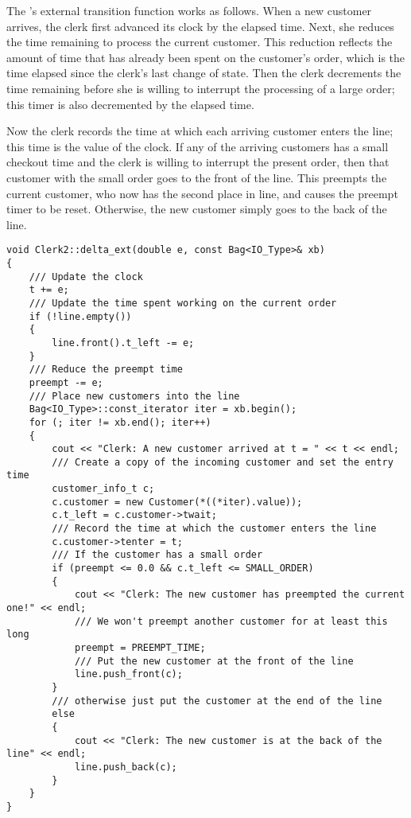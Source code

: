 The 's external transition function works as follows. When a new customer arrives, the clerk first advanced its clock by the elapsed time. Next, she reduces the time remaining to process the current customer. This reduction reflects the amount of time that has already been spent on the customer's order, which is the time elapsed since the clerk's last change of state. Then the clerk decrements the time remaining before she is willing to interrupt the processing of a large order; this timer is also decremented by the elapsed time.

Now the clerk records the time at which each arriving customer enters the line; this time is the value of the clock. If any of the arriving customers has a small checkout time and the clerk is willing to interrupt the present order, then that customer with the small order goes to the front of the line. This preempts the current customer, who now has the second place in line, and causes the preempt timer to be reset. Otherwise, the new customer simply goes to the back of the line.
\begin{verbatim}
void Clerk2::delta_ext(double e, const Bag<IO_Type>& xb)
{
    /// Update the clock
    t += e;
    /// Update the time spent working on the current order
    if (!line.empty())
    {
        line.front().t_left -= e;
    }
    /// Reduce the preempt time
    preempt -= e;
    /// Place new customers into the line
    Bag<IO_Type>::const_iterator iter = xb.begin();
    for (; iter != xb.end(); iter++)
    {
        cout << "Clerk: A new customer arrived at t = " << t << endl;
        /// Create a copy of the incoming customer and set the entry time
        customer_info_t c;
        c.customer = new Customer(*((*iter).value));
        c.t_left = c.customer->twait;
        /// Record the time at which the customer enters the line
        c.customer->tenter = t;
        /// If the customer has a small order
        if (preempt <= 0.0 && c.t_left <= SMALL_ORDER)
        {
            cout << "Clerk: The new customer has preempted the current one!" << endl;
            /// We won't preempt another customer for at least this long
            preempt = PREEMPT_TIME;
            /// Put the new customer at the front of the line
            line.push_front(c);
        }
        /// otherwise just put the customer at the end of the line
        else 
        {
            cout << "Clerk: The new customer is at the back of the line" << endl;
            line.push_back(c);
        }
    }
}
\end{verbatim}

